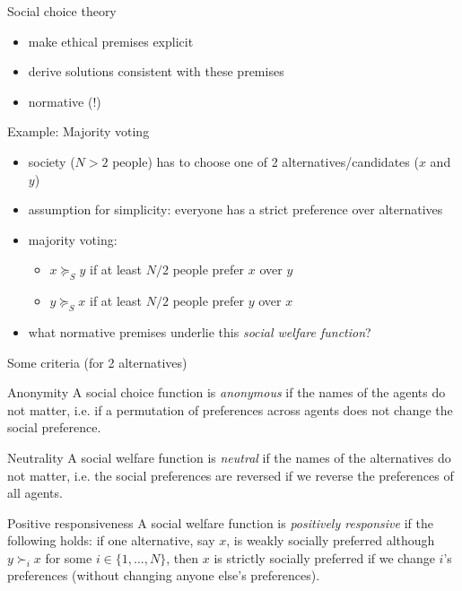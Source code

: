 \documentclass[bigger]{beamer}
\begin{document}
\begin{frame}[label={sec:org57b9ac0}]{Social choice theory}
\begin{itemize}
\item make ethical premises explicit
\item derive solutions consistent with these premises
\item normative (!)
\end{itemize}
\end{frame}
\begin{frame}[label={sec:orgb67bb36}]{Example: Majority voting}
\begin{itemize}
\item society (\(N>2\) people) has to choose one of 2 alternatives/candidates (\(x\) and \(y\))
\item assumption for simplicity: everyone has a strict preference over alternatives
\item majority voting:
\begin{itemize}
\item \(x\succeq_S y\) if at least \(N/2\) people prefer \(x\) over \(y\)
\item \(y\succeq_S x\) if at least \(N/2\) people prefer \(y\) over \(x\)
\end{itemize}
\item what normative premises underlie this \emph{social welfare function}?
\end{itemize}
\end{frame}
\begin{frame}[label={sec:org8d863ab}]{Some criteria (for 2 alternatives)}
\begin{block}{Anonymity}
A social choice function is \emph{anonymous} if the names of the agents do not matter, i.e. if a permutation of preferences across agents does not change the social preference.
\end{block}

\begin{block}{Neutrality}
A social welfare function is \emph{neutral} if the names of the alternatives do not matter, i.e. the social preferences are reversed if we reverse the preferences of all agents.
\end{block}

\begin{block}{Positive responsiveness}
A social welfare function is \emph{positively responsive} if the following holds: if one alternative, say \(x\), is weakly socially preferred although \(y\succ_i x\) for some \(i\in\{1,\dots,N\}\), then \(x\) is strictly socially preferred if we change \(i\)'s preferences (without changing anyone else's preferences).
\end{block}
\end{frame}
\end{document}
